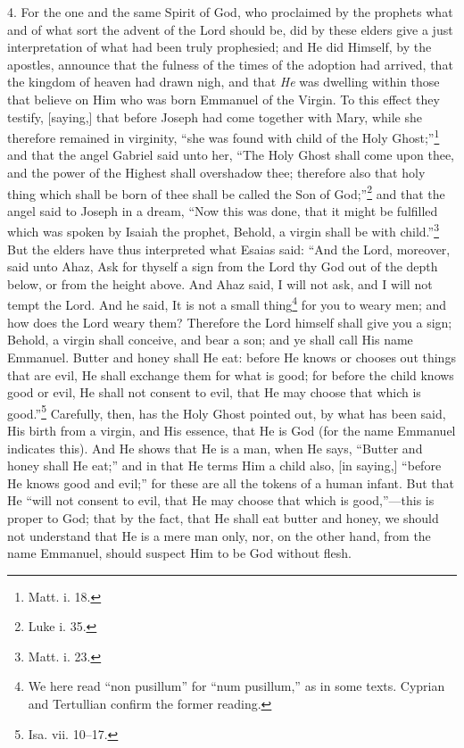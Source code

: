 4. For the one and the same Spirit of God, who proclaimed by the prophets what and of what sort the advent of the Lord should be, did by these elders give a just interpretation of what had been truly prophesied; and He did Himself, by the apostles, announce that the fulness of the times of the adoption had arrived, that the kingdom of heaven had drawn nigh, and that \emph{He} was dwelling within those that believe on Him who was born Emmanuel of the Virgin. To this effect they testify, [saying,] that before Joseph had come together with Mary, while she therefore remained in virginity, “she was found with child of the Holy Ghost;”\footnote{Matt. i. 18.} and that the angel Gabriel said unto her, “The Holy Ghost shall come upon thee, and the power of the Highest shall overshadow thee; therefore also that holy thing which shall be born of thee shall be called the Son of God;”\footnote{Luke i. 35.} and that the angel said to Joseph in a dream, “Now this was done, that it might be fulfilled which was spoken by Isaiah the prophet, Behold, a virgin shall be with child.”\footnote{Matt. i. 23.} But the elders have thus interpreted what Esaias said: “And the Lord, moreover, said unto Ahaz, Ask for thyself a sign from the Lord thy God out of the depth below, or from the height above. And Ahaz said, I will not ask, and I will not tempt the Lord. And he said, It is not a small thing\footnote{We here read “non pusillum” for “num pusillum,” as in some texts. Cyprian and Tertullian confirm the former reading.} for you to weary men; and how does the Lord weary them? Therefore the Lord himself shall give you a sign; Behold, a virgin shall conceive, and bear a son; and ye shall call His name Emmanuel. Butter and honey shall He eat: before He knows or chooses out things that are evil, He shall exchange them for what is good; for before the child knows good or evil, He shall not consent to evil, that He may choose that which is good.”\footnote{Isa. vii. 10–17.} Carefully, then, has the Holy Ghost pointed out, by what has been said, His birth from a virgin, and His essence, that He is God (for the name Emmanuel indicates this). And He shows that He is a man, when He says, “Butter and honey shall He eat;” and in that He terms Him a child also, [in saying,] “before He knows good and evil;” for these are all the tokens of a human infant. But that He “will not consent to evil, that He may choose that which is good,”—this is proper to God; that by the fact, that He shall eat butter and honey, we should not understand that He is a mere man only, nor, on the other hand, from the name Emmanuel, should suspect Him to be God without flesh.

